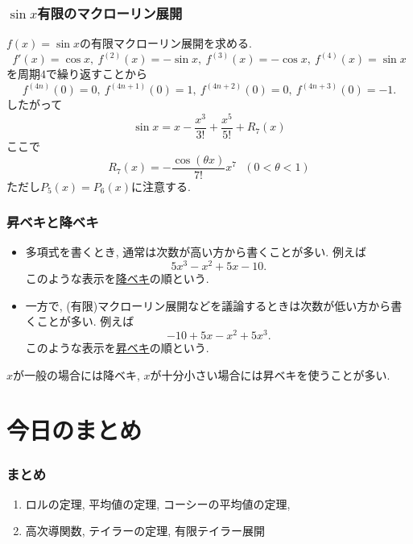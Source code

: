 


\begin{frame}
\frametitle{$\sin x$有限のマクローリン展開}

$f(x)=\sin x$の有限マクローリン展開を求める. 
$$
f'(x)=\cos x, \ f^{(2)}(x)=-\sin x, \ f^{(3)}(x)=-\cos x, \ f^{(4)}(x)=\sin x
$$
を周期$4$で繰り返すことから
$$
 f^{(4n)}(0)=0, \ f^{(4n+1)}(0)=1, \ f^{(4n+2)}(0)=0, \ f^{(4n+3)}(0)=-1. 
$$
したがって
$$
\sin x =x-\frac{x^3}{3!}+\frac{x^5}{5!}+R_7(x)
$$
ここで
$$
R_7(x)=- \frac{\cos (\theta x)}{7!}x^7 \ \ \ (0 < \theta <1)
$$
ただし$P_5(x)=P_6(x)$に注意する. 
\end{frame}




\begin{frame}
\frametitle{昇ベキと降ベキ}

\begin{itemize}
\item 多項式を書くとき, 通常は次数が高い方から書くことが多い. 例えば
$$
5x^3-x^2+5x-10. 
$$
このような表示を\underline{降ベキ}の順という. 
\item 一方で, (有限)マクローリン展開などを議論するときは次数が低い方から書くことが多い. 例えば
$$
-10+5x-x^2+5x^3. 
$$
このような表示を\underline{昇ベキ}の順という. 
\end{itemize}

$x$が一般の場合には降ベキ, $x$が十分小さい場合には昇ベキを使うことが多い. 

\end{frame}













\section{今日のまとめ}
\begin{frame}
\frametitle{まとめ}   


\begin{enumerate}
\item ロルの定理, 平均値の定理, コーシーの平均値の定理, 
\item 高次導関数, テイラーの定理, 有限テイラー展開
\end{enumerate} 

\end{frame}